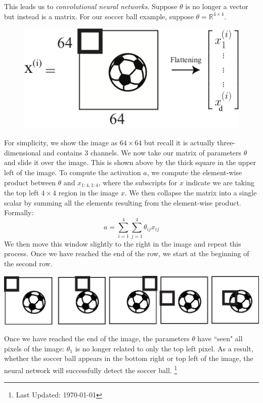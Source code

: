 \documentclass{article}
\numberwithin{equation}{section}
\newcommand\blfootnote[1]{%
	\begingroup
	\renewcommand\thefootnote{}\footnote{#1}%
	\addtocounter{footnote}{-1}%
	\endgroup
}
\begin{document}
This leads us to \textit{convolutional neural networks}. Suppose $\theta$ is no longer a vector but instead is a matrix.
For our soccer ball example, suppose $\theta = \mathbb{R}^{4 \times 4}$.
\begin{figure}[h]
\centering
\includegraphics[width=0.6\linewidth]{cnn_d}
\end{figure}
For simplicity, we show the image as $64 \times 64$ but recall it is actually three-dimensional and contains 3 channels. 
We now take our matrix of parameters $\theta$ and slide it over the image. This is shown above by the thick square in the upper left of the image.
To compute the activation $a$, we compute the element-wise product between $\theta$ and $x_{1:4,1:4}$, where the subscripts for $x$ indicate we are taking the top left $4 \times 4$ region in the image $x$.
We then collapse the matrix into a single scalar by summing all the elements resulting from the element-wise product. Formally:
\begin{equation}
a = \sum\limits_{i=1}^{4} \sum\limits_{j=1}^{4} \theta_{ij} x_{ij}
\end{equation}
We then move this window slightly to the right in the image and repeat this process. Once we have reached the end of the row, we start at the beginning of the second row.
\begin{center}
\includegraphics[width=0.9\linewidth]{sliding_window.eps}
\end{center}
Once we have reached the end of the image, the parameters $\theta$ have ``seen" all pixels of the image: $\theta_1$ is no longer related to only the top left pixel.
As a result, whether the soccer ball appears in the bottom right or top left of the image, the neural network will successfully detect the soccer ball.\blfootnote{Last Updated: \today}
\end{document}
